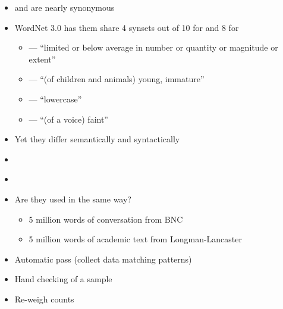 \documentclass[a4paper,landscape,headrule,footrule,dvips]{foils}
\begin{document}
\begin{CJK}{UTF8}{min}
\begin{itemize}
\item {} and  are nearly synonymous
\item WordNet 3.0 has them share 4 synsets out of 10 for  and 8 for 
  \begin{itemize}
  \item {} --- ``limited or below average in number or quantity or magnitude or extent'' 
  \item {} --- ``(of children and animals) young, immature'' 
  \item {} --- ``lowercase'' 
  \item {} --- ``(of a voice) faint'' 
\end{itemize}
\item Yet they differ semantically and syntactically
\end{itemize}

\MyLogo{}
\begin{itemize}
\item {}
  \\ 
\item {}
  \\ 
\item Are they used in the same way?
  \begin{itemize}
  \item 5 million words of conversation from BNC
  \item 5 million words of academic text from Longman-Lancaster
  \end{itemize}
\end{itemize}


\begin{itemize}
\item Automatic pass (collect data matching patterns)
\item Hand checking of a sample
\item Re-weigh counts
\end{itemize}


\end{CJK}
\end{document}
